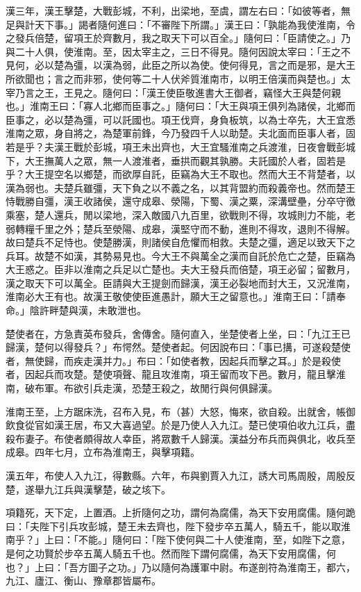 \begin{pinyinscope}
漢三年，漢王擊楚，大戰彭城，不利，出梁地，至虞，謂左右曰：「如彼等者，無足與計天下事。」謁者隨何進曰：「不審陛下所謂。」漢王曰：「孰能為我使淮南，令之發兵倍楚，留項王於齊數月，我之取天下可以百全。」隨何曰：「臣請使之。」乃與二十人俱，使淮南。至，因太宰主之，三日不得見。隨何因說太宰曰：「王之不見何，必以楚為彊，以漢為弱，此臣之所以為使。使何得見，言之而是邪，是大王所欲聞也；言之而非邪，使何等二十人伏斧質淮南市，以明王倍漢而與楚也。」太宰乃言之王，王見之。隨何曰：「漢王使臣敬進書大王御者，竊怪大王與楚何親也。」淮南王曰：「寡人北鄉而臣事之。」隨何曰：「大王與項王俱列為諸侯，北鄉而臣事之，必以楚為彊，可以託國也。項王伐齊，身負板筑，以為士卒先，大王宜悉淮南之眾，身自將之，為楚軍前鋒，今乃發四千人以助楚。夫北面而臣事人者，固若是乎？夫漢王戰於彭城，項王未出齊也，大王宜騷淮南之兵渡淮，日夜會戰彭城下，大王撫萬人之眾，無一人渡淮者，垂拱而觀其孰勝。夫託國於人者，固若是乎？大王提空名以鄉楚，而欲厚自託，臣竊為大王不取也。然而大王不背楚者，以漢為弱也。夫楚兵雖彊，天下負之以不義之名，以其背盟約而殺義帝也。然而楚王恃戰勝自彊，漢王收諸侯，還守成皋、滎陽，下蜀、漢之粟，深溝壁壘，分卒守徼乘塞，楚人還兵，閒以梁地，深入敵國八九百里，欲戰則不得，攻城則力不能，老弱轉糧千里之外；楚兵至滎陽、成皋，漢堅守而不動，進則不得攻，退則不得解。故曰楚兵不足恃也。使楚勝漢，則諸侯自危懼而相救。夫楚之彊，適足以致天下之兵耳。故楚不如漢，其勢易見也。今大王不與萬全之漢而自託於危亡之楚，臣竊為大王惑之。臣非以淮南之兵足以亡楚也。夫大王發兵而倍楚，項王必留；留數月，漢之取天下可以萬全。臣請與大王提劍而歸漢，漢王必裂地而封大王，又況淮南，淮南必大王有也。故漢王敬使使臣進愚計，願大王之留意也。」淮南王曰：「請奉命。」陰許畔楚與漢，未敢泄也。

楚使者在，方急責英布發兵，舍傳舍。隨何直入，坐楚使者上坐，曰：「九江王已歸漢，楚何以得發兵？」布愕然。楚使者起。何因說布曰：「事已搆，可遂殺楚使者，無使歸，而疾走漢并力。」布曰：「如使者教，因起兵而擊之耳。」於是殺使者，因起兵而攻楚。楚使項聲、龍且攻淮南，項王留而攻下邑。數月，龍且擊淮南，破布軍。布欲引兵走漢，恐楚王殺之，故閒行與何俱歸漢。

淮南王至，上方踞床洗，召布入見，布（甚）大怒，悔來，欲自殺。出就舍，帳御飲食從官如漢王居，布又大喜過望。於是乃使人入九江。楚已使項伯收九江兵，盡殺布妻子。布使者頗得故人幸臣，將眾數千人歸漢。漢益分布兵而與俱北，收兵至成皋。四年七月，立布為淮南王，與擊項籍。

漢五年，布使人入九江，得數縣。六年，布與劉賈入九江，誘大司馬周殷，周殷反楚，遂舉九江兵與漢擊楚，破之垓下。

項籍死，天下定，上置酒。上折隨何之功，謂何為腐儒，為天下安用腐儒。隨何跪曰：「夫陛下引兵攻彭城，楚王未去齊也，陛下發步卒五萬人，騎五千，能以取淮南乎？」上曰：「不能。」隨何曰：「陛下使何與二十人使淮南，至，如陛下之意，是何之功賢於步卒五萬人騎五千也。然而陛下謂何腐儒，為天下安用腐儒，何也？」上曰：「吾方圖子之功。」乃以隨何為護軍中尉。布遂剖符為淮南王，都六，九江、廬江、衡山、豫章郡皆屬布。


\end{pinyinscope}
